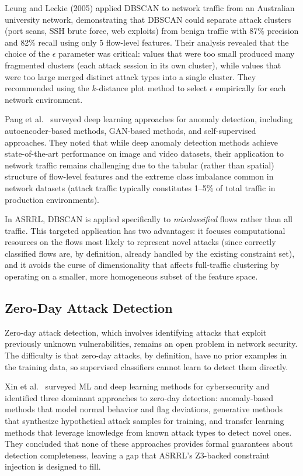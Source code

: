 \documentclass[12pt, letterpaper, oneside]{report}
\newcommand{\ASRRL}{\textsc{ASRRL}}
\begin{document}
Leung and Leckie (2005) applied DBSCAN to network traffic from an Australian university network, demonstrating that DBSCAN could separate attack clusters (port scans, SSH brute force, web exploits) from benign traffic with 87\% precision and 82\% recall using only 5 flow-level features. Their analysis revealed that the choice of the $\epsilon$ parameter was critical: values that were too small produced many fragmented clusters (each attack session in its own cluster), while values that were too large merged distinct attack types into a single cluster. They recommended using the $k$-distance plot method to select $\epsilon$ empirically for each network environment.

Pang et al.~\cite{pang2021} surveyed deep learning approaches for anomaly detection, including autoencoder-based methods, GAN-based methods, and self-supervised approaches. They noted that while deep anomaly detection methods achieve state-of-the-art performance on image and video datasets, their application to network traffic remains challenging due to the tabular (rather than spatial) structure of flow-level features and the extreme class imbalance common in network datasets (attack traffic typically constitutes 1--5\% of total traffic in production environments).

In \ASRRL{}, DBSCAN is applied specifically to \emph{misclassified} flows rather than all traffic. This targeted application has two advantages: it focuses computational resources on the flows most likely to represent novel attacks (since correctly classified flows are, by definition, already handled by the existing constraint set), and it avoids the curse of dimensionality that affects full-traffic clustering by operating on a smaller, more homogeneous subset of the feature space.

\subsection{Zero-Day Attack Detection}

Zero-day attack detection, which involves identifying attacks that exploit previously unknown vulnerabilities, remains an open problem in network security. The difficulty is that zero-day attacks, by definition, have no prior examples in the training data, so supervised classifiers cannot learn to detect them directly.

Xin et al.~\cite{xin2018} surveyed ML and deep learning methods for cybersecurity and identified three dominant approaches to zero-day detection: anomaly-based methods that model normal behavior and flag deviations, generative methods that synthesize hypothetical attack samples for training, and transfer learning methods that leverage knowledge from known attack types to detect novel ones. They concluded that none of these approaches provides formal guarantees about detection completeness, leaving a gap that \ASRRL{}'s Z3-backed constraint injection is designed to fill.
\end{document}

